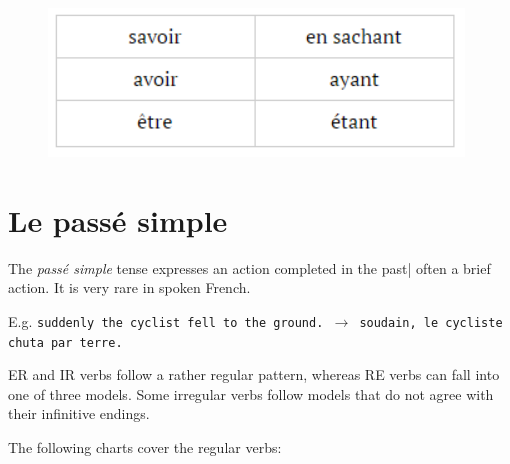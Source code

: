 \documentclass[11pt, oneside]{book}
\begin{document}
{{\begin{figure}[H]
	\includegraphics[scale=0.8]{charts/participePresentIrregulars.png}
\end{figure} \vspace{0.5\baselineskip} 


\section{Le pass\'e simple}

The \textit{pass\'e simple} tense expresses an action completed in the past| often a brief action. It is very rare in spoken French. \vspace{0.5\baselineskip} 

E.g. \texttt{suddenly the cyclist fell to the ground. $\rightarrow$ soudain, le cycliste chuta par terre.} \vspace{0.5\baselineskip} 

ER and IR verbs follow a rather regular pattern, whereas RE verbs can fall into one of three models. Some irregular verbs follow models that do not agree with their infinitive endings.  \vspace{0.5\baselineskip} 

The following charts cover the regular verbs: 

}}
\end{document}
